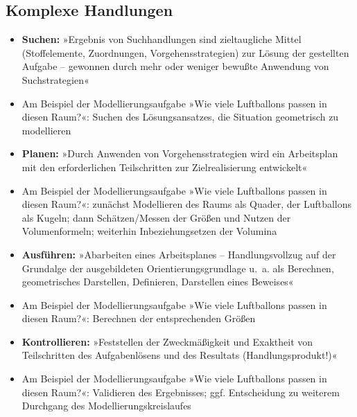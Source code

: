 \documentclass[
]{scrbook}
\renewenvironment{quote}{
  \list{}{
	\leftmargin0.2cm   %
    \rightmargin\leftmargin
      	\def\FrameCommand
    {%
        {\color{quoteColor}\vrule width 2pt}%
        \hspace{0pt}%
    }%
    \MakeFramed{\advance \hsize -\width \FrameRestore}    \color{quoteColor}
    }
  \item\relax
}
{\endlist\color{black}\endMakeFramed}
\theoremstyle{definition}
\theoremstyle{definition}
\theoremstyle{definition}
\theoremstyle{definition}
\theoremstyle{remark}
\begin{document}
\subsection{Komplexe Handlungen}\label{komplexe-handlungen}

\begin{itemize}
\item
  \textbf{Suchen:} »Ergebnis von Suchhandlungen sind zieltaugliche Mittel (Stoffelemente, Zuordnungen, Vorgehensstrategien) zur Lösung der gestellten Aufgabe -- gewonnen durch mehr oder weniger bewußte Anwendung von Suchstrategien«

  \begin{quote}
  Am Beispiel der Modellierungsaufgabe »Wie viele Luftballons passen in diesen Raum?«: Suchen des Lösungsansatzes, die Situation geometrisch zu modellieren
  \end{quote}
\item
  \textbf{Planen:} »Durch Anwenden von Vorgehensstrategien wird ein Arbeitsplan mit den erforderlichen Teilschritten zur Zielrealisierung entwickelt«

  \begin{quote}
  Am Beispiel der Modellierungsaufgabe »Wie viele Luftballons passen in diesen Raum?«: zunächst Modellieren des Raums als Quader, der Luftballons als Kugeln; dann Schätzen/Messen der Größen und Nutzen der Volumenformeln; weiterhin Inbeziehungsetzen der Volumina
  \end{quote}
\item
  \textbf{Ausführen:} »Abarbeiten eines Arbeitsplanes -- Handlungsvollzug auf der Grundalge der ausgebildeten Orientierungsgrundlage u.~a. als Berechnen, geometrisches Darstellen, Definieren, Darstellen eines Beweises«

  \begin{quote}
  Am Beispiel der Modellierungsaufgabe »Wie viele Luftballons passen in diesen Raum?«: Berechnen der entsprechenden Größen
  \end{quote}
\item
  \textbf{Kontrollieren:} »Feststellen der Zweckmäßigkeit und Exaktheit von Teilschritten des Aufgabenlösens und des Resultats (Handlungsprodukt!)«

  \begin{quote}
  Am Beispiel der Modellierungsaufgabe »Wie viele Luftballons passen in diesen Raum?«: Validieren des Ergebnisses; ggf. Entscheidung zu weiterem Durchgang des Modellierungskreislaufes
  \end{quote}
\end{itemize}
\end{document}

